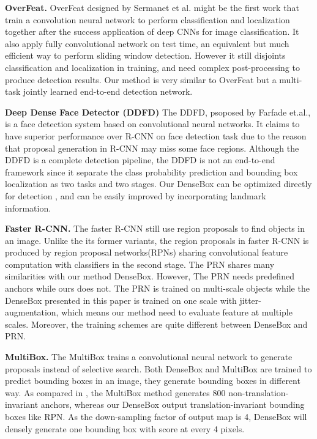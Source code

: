 \textbf{OverFeat.} OverFeat\cite{sermanet2013overfeat} designed by Sermanet et al. might be the first work that train a convolution neural network to perform classification and localization together after the success application of deep CNNs for image classification\cite{krizhevsky2012imagenet}. It also apply fully convolutional network on test time, an equivalent but much efficient way to perform sliding window detection. However it still disjoints classification and localization in training, and need complex post-processing to produce detection results. Our method is very similar to OverFeat but a multi-task jointly learned end-to-end detection network. 

\textbf{Deep Dense Face Detector (DDFD)} The DDFD, psoposed by Farfade et.al.\cite{farfade2015multi},  is a face detection system based on convolutional neural networks. It claims to have superior performance over R-CNN on face detection task due to the reason that proposal generation in R-CNN may miss some face regions.  Although the DDFD is a complete detection pipeline,  the DDFD is not an end-to-end framework since it separate the class probability prediction and bounding box localization as two tasks and two stages.  Our DenseBox can be optimized directly for detection , and can be easily improved by incorporating landmark information. 

\textbf{Faster R-CNN.} The faster R-CNN\cite{ren2015faster} still use region proposals to find objects in an image. Unlike the its former variants, the region proposals in faster R-CNN is produced by region proposal networks(RPNs) sharing convolutional feature computation with classifiers in the second stage. The PRN shares many similarities with our method DenseBox. However, The PRN needs predefined anchors while ours does not. The PRN is trained on multi-scale objects while the DenseBox presented in this paper is trained on one scale with jitter-augmentation, which means our method need to evaluate feature at multiple scales. Moreover, the training schemes are quite different between DenseBox and PRN. 

\textbf{MultiBox.} The MultiBox\cite{erhan2014scalable} trains a convolutional neural network to generate proposals instead of selective search. Both DenseBox and MultiBox are trained to predict bounding boxes in an image, they generate bounding boxes in different way.  As compared in \cite{ren2015faster} , the MultiBox method generates 800 non-translation-invariant anchors, whereas our DenseBox output translation-invariant bounding boxes like RPN. As the down-sampling factor of output map is 4,  DenseBox will densely generate one bounding box with score at every 4 pixels. 

